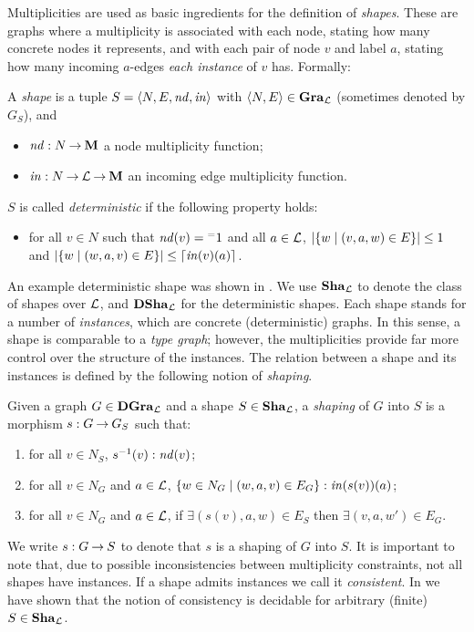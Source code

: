 %
Multiplicities are used as basic ingredients for the definition of {\em
shapes}. These are graphs where a multiplicity is associated with each node,
stating how many concrete nodes it represents, and with each pair of node $v$
and label $a$, stating how many incoming $a$-edges \emph{each instance} of $v$
has.  Formally:
%
\begin{definition}[shape]
  A {\em shape} is a tuple $S={\langle N,E,\mathit{nd},\mathit{in} \rangle}$ with
  ${\langle N,E \rangle}\in \mathbf{Gra}_{\cal L}$ (sometimes denoted by $G_S$), and
%
\begin{itemize}\noitemsep\smalltopsep
\item $\mathit{nd}:N \mathbin{\rightarrow} \mathbf{M}$  a node multiplicity function;
\item $\mathit{in}:N \mathbin{\rightarrow} {\cal L} \mathbin{\rightarrow} \mathbf{M}$  an
  incoming edge multiplicity function. %
\end{itemize}\smallbottomsep
%
$S$ is called \emph{deterministic} if the following property holds:
%
\begin{itemize}\smalltopsep\noitemsep
\item for all $v\in N$ such that $\mathit{nd}(v)={{}^{=}{1}}$ and all $a\in {\cal L}$,
  $|{{\textstyle\mathopen\{ w \mid (v,a,w)\in E \mathclose\}}}|\leq 1$ and 
  $|{{\textstyle\mathopen\{ w \mid (w,a,v)\in E \mathclose\}}}|\leq {\lceil}{\mathit{in}(v)(a)}{\rceil}$.
\end{itemize}
\end{definition}
%
An example deterministic shape was shown in .
We use $\mathbf{Sha}_{\cal L}$ to denote the class of shapes over ${\cal L}$, and $\mathbf{DSha}_{\cal L}$
for the deterministic shapes. Each shape stands for a number of
\emph{instances}, which are concrete (deterministic) graphs. In this sense, a
shape is comparable to a \emph{type graph}; however, the multiplicities provide
far more control over the structure of the instances. The relation between a
shape and its instances is defined by the following notion of \emph{shaping}.
%
\begin{definition}[shaping]
  Given a graph $G \in \mathbf{DGra}_{\cal L}$ and a shape $S \in \mathbf{Sha}_{\cal L}$, a {\em
  shaping} of $G$ into $S$ is a morphism $s:G \mathbin{\rightarrow} G_S$ such that:
  \begin{enumerate}\noitemsep\smalltopsep
  \item for all $v \in N_S$, $s^{-1}(v):\mathit{nd}(v)$;
  \item for all $v \in N_G$ and $a \in {\cal L}$, ${\textstyle\mathopen\{ w \in N_G \mid (w,a,v) \in
    E_G \mathclose\}}:\mathit{in}(s(v))(a)$;
  \item for all $v\in N_G$ and $a\in {\cal L}$, if $\exists (s(v),a,w)\in E_S$
    then $\exists (v,a,w')\in E_G$.
  \end{enumerate}
\end{definition}
%
We write $s:G \mathbin{\rightarrow} S$ to denote that $s$ is a shaping of $G$ into $S$. It is
important to note that, due to possible inconsistencies between multiplicity
constraints, not all shapes have instances. If a shape admits instances we call
it {\em consistent}. In \cite{Rens04-esop} we have shown that the notion of
consistency is decidable for arbitrary (finite) $S \in \mathbf{Sha}_{\cal L}$.

